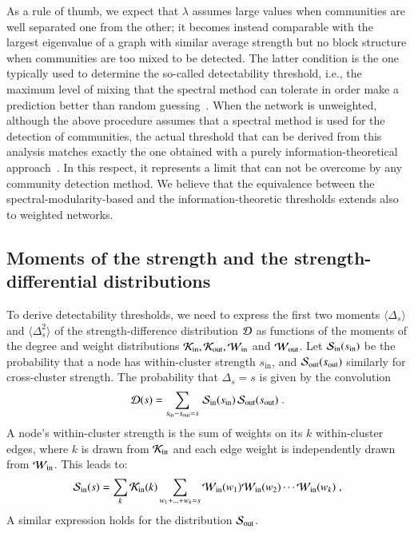\documentclass[a4paper,pre,superscriptaddress,floatfix,nofootinbib,twocolumn]{revtex4-1}
\begin{document}
As a rule of thumb, we expect that $\lambda$ assumes large values when communities are well separated one from the other; it becomes instead comparable with the largest eigenvalue of a graph with similar average strength but no block structure when communities are too mixed to be detected. The latter condition is the one typically used to determine the so-called detectability threshold, i.e., the maximum level of mixing that the spectral method can tolerate in order make a prediction better than random guessing~\cite{nadakuditi2012graph}. When the network is unweighted, although the above procedure assumes that a spectral method  is used for the detection of communities, the actual threshold that can be derived from this analysis matches exactly the one obtained with a purely information-theoretical approach~\cite{abbe2015community}. In this respect, it represents a limit that can not be overcome by any community detection method. We believe that the equivalence between the spectral-modularity-based  and the information-theoretic thresholds extends also to weighted networks.

\subsection*{Moments of the strength and the strength-differential distributions}

To derive detectability thresholds, we need to express the first two moments $\langle \Delta_{s} \rangle$ and $\langle \Delta_{s}^2 \rangle$ of the strength-difference distribution ${\cal D}$
as functions of the moments of the degree and weight distributions $\cal K_\text{in}, \cal K_\text{out}, \cal W_\text{in} $ and $\cal W_\text{out} $.
Let ${\cal S}_\text{in}(s_\text{in})$ be the probability that a node has within-cluster strength $s_\text{in}$, and ${\cal S}_\text{out}(s_\text{out})$ similarly for cross-cluster strength.
The probability that $\Delta_{s} = s$ is given by the convolution
\begin{equation}
    {\cal D}(s) = \sum_{s_\text{in} - s_\text{out} = s} \,  {\cal S}_\text{in} (s_\text{in}) \, {\cal S}_\text{out} (s_\text{out}) \; .
\label{eq:conv2}
\end{equation}
A node's within-cluster strength is the sum of weights on its $k$ within-cluster edges, where $k$ is drawn from ${\cal K}_\text{in}$ and each edge weight is independently drawn from ${\cal W}_\text{in}$.
This leads to:
\begin{equation}
    {\cal S}_\text{in} (s) =
    \sum_{k} {\cal K}_\text{in}(k) \sum_{w_1 + \ldots + w_k = s} {\cal W}_\text{in}(w_1) {\cal W}_\text{in}(w_2) \cdots {\cal W}_\text{in}(w_k) \; ,
    \label{eq:conv1}
\end{equation}
A similar expression holds for the distribution ${\cal S}_\text{out}$.
\end{document}
